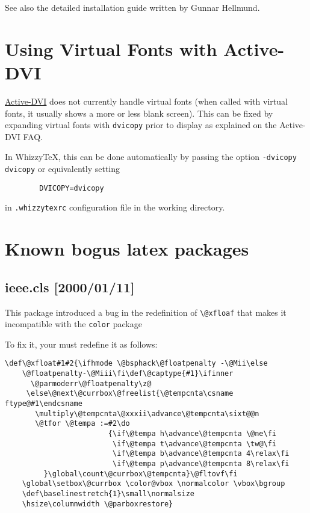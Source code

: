 \documentclass{article}
\def \WhizzyTeX{Whizzy\TeX}
\begin{document}
See also the detailed
{installation guide} written by
{Gunnar Hellmund}.

\section{Using Virtual Fonts with Active-DVI}

\href{http://pauillac.inria.fr/advi/}{Active-DVI}
does not currently handle virtual fonts (when called with virtual fonts, it
usually shows a more or less blank screen). This can be fixed by expanding
virtual fonts with \texttt{dvicopy} prior to display as explained on the
{Active-DVI} FAQ.

In {\WhizzyTeX}, this can be done automatically by passing the option
\texttt{-dvicopy dvicopy} or equivalently setting
\begin{verbatim}
        DVICOPY=dvicopy
\end{verbatim}
in \texttt{.whizzytexrc} configuration file in the working directory.

\section{Known bogus latex packages}

\subsection{ieee.cls [2000/01/11]}

This package introduced a bug in the redefinition of \verb"\@xfloaf" 
that makes it incompatible with the \texttt{color} package

To fix it, your must redefine it as follows:
{\small
\begin{verbatim}
\def\@xfloat#1#2{\ifhmode \@bsphack\@floatpenalty -\@Mii\else
    \@floatpenalty-\@Miii\fi\def\@captype{#1}\ifinner
      \@parmoderr\@floatpenalty\z@
     \else\@next\@currbox\@freelist{\@tempcnta\csname ftype@#1\endcsname
       \multiply\@tempcnta\@xxxii\advance\@tempcnta\sixt@@n
       \@tfor \@tempa :=#2\do
                        {\if\@tempa h\advance\@tempcnta \@ne\fi
                         \if\@tempa t\advance\@tempcnta \tw@\fi
                         \if\@tempa b\advance\@tempcnta 4\relax\fi
                         \if\@tempa p\advance\@tempcnta 8\relax\fi
         }\global\count\@currbox\@tempcnta}\@fltovf\fi
    \global\setbox\@currbox \color@vbox \normalcolor \vbox\bgroup
    \def\baselinestretch{1}\small\normalsize
    \hsize\columnwidth \@parboxrestore}
\end{verbatim}}
\end{document}

